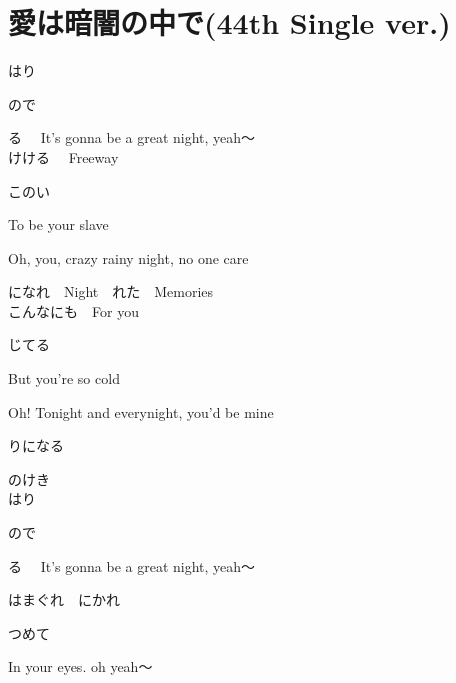 \section{ 愛は暗闇の中で(44th Single ver.)}

\large{

はり

ので

る　
It's gonna be a great night, yeah～
\\

けける　
Freeway

このい　

To be your slave

Oh, you, crazy rainy night, no one care

になれ　Night　れた　Memories
\\

こんなにも　For you

じてる　

But you're so cold

Oh! Tonight and everynight, you'd be mine

りになる

のけき
\\

はり

ので

る　
It's gonna be a great night, yeah～

はまぐれ　にかれ

つめて　

In your eyes. oh yeah～
\\


}
